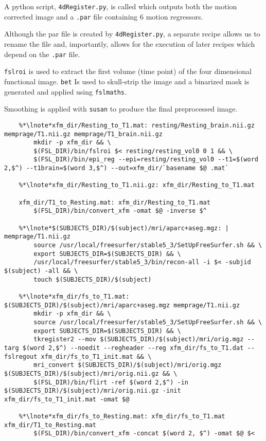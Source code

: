 A python script, \texttt{4dRegister.py}, is called which outputs both the motion corrected image and a \texttt{.par} file containing 6 motion regressors.

Although the par file is created by \texttt{4dRegister.py}, a separate recipe allows us to rename the file and, importantly, allows for the execution of later recipes which depend on the \texttt{.par} file.

\texttt{fslroi} is used to extract the first volume (time point) of the four dimensional functional image. \texttt{bet} Is used to skull-strip the image and a binarized mask is generated and applied using \texttt{fslmaths}.

Smoothing is applied with \texttt{susan} to produce the final preprocessed image.

\begin{lstlisting}
	%*\lnote*xfm_dir/Resting_to_T1.mat: resting/Resting_brain.nii.gz memprage/T1.nii.gz memprage/T1_brain.nii.gz
		mkdir -p xfm_dir && \
		$(FSL_DIR)/bin/fslroi $< resting/resting_vol0 0 1 && \
		$(FSL_DIR)/bin/epi_reg --epi=resting/resting_vol0 --t1=$(word 2,$^) --t1brain=$(word 3,$^) --out=xfm_dir/`basename $@ .mat`
	
	%*\lnote*xfm_dir/Resting_to_T1.nii.gz: xfm_dir/Resting_to_T1.mat
	
	xfm_dir/T1_to_Resting.mat: xfm_dir/Resting_to_T1.mat
		$(FSL_DIR)/bin/convert_xfm -omat $@ -inverse $^
	
	%*\lnote*$(SUBJECTS_DIR)/$(subject)/mri/aparc+aseg.mgz: | memprage/T1.nii.gz
		source /usr/local/freesurfer/stable5_3/SetUpFreeSurfer.sh && \
		export SUBJECTS_DIR=$(SUBJECTS_DIR) && \
		/usr/local/freesurfer/stable5_3/bin/recon-all -i $< -subjid $(subject) -all && \
		touch $(SUBJECTS_DIR)/$(subject)
	
	%*\lnote*xfm_dir/fs_to_T1.mat: $(SUBJECTS_DIR)/$(subject)/mri/aparc+aseg.mgz memprage/T1.nii.gz
		mkdir -p xfm_dir && \
		source /usr/local/freesurfer/stable5_3/SetUpFreeSurfer.sh && \
		export SUBJECTS_DIR=$(SUBJECTS_DIR) && \
		tkregister2 --mov $(SUBJECTS_DIR)/$(subject)/mri/orig.mgz --targ $(word 2,$^) --noedit --regheader --reg xfm_dir/fs_to_T1.dat --fslregout xfm_dir/fs_to_T1_init.mat && \
		mri_convert $(SUBJECTS_DIR)/$(subject)/mri/orig.mgz $(SUBJECTS_DIR)/$(subject)/mri/orig.nii.gz && \
		$(FSL_DIR)/bin/flirt -ref $(word 2,$^) -in $(SUBJECTS_DIR)/$(subject)/mri/orig.nii.gz -init xfm_dir/fs_to_T1_init.mat -omat $@
	
	%*\lnote*xfm_dir/fs_to_Resting.mat: xfm_dir/fs_to_T1.mat xfm_dir/T1_to_Resting.mat
		$(FSL_DIR)/bin/convert_xfm -concat $(word 2, $^) -omat $@ $<
\end{lstlisting}

